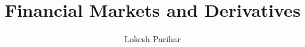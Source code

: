 \documentclass{article}
\title{Financial Markets and Derivatives}
\author{Lokesh Parihar}
\begin{document}
\maketitle{}

\tableofcontents

\newpage{}







\end{document}
